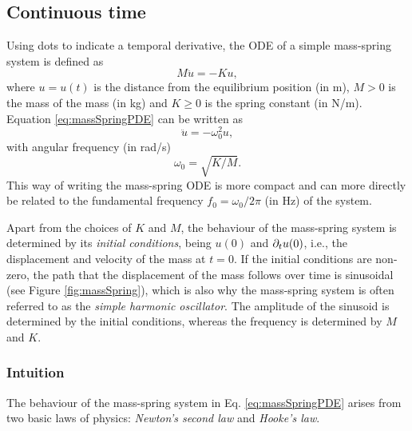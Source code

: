 \subsection{Continuous time}\label{sec:massSpringCont}
Using dots to indicate a temporal derivative, the ODE of a simple mass-spring system is defined as
\begin{equation}\label{eq:massSpringPDE}
    M\ddot u = -Ku,
\end{equation}
where $u = u(t)$ is the distance from the equilibrium position (in m), $M>0$ is the mass of the mass (in kg) and $K\geq 0$ is the spring constant (in N/m). Equation \eqref{eq:massSpringPDE} can be written as
\begin{equation}\label{eq:massSpringCompact}
    \ddot u = -\omega_0^2u,
\end{equation}
with angular frequency (in rad/s)
\begin{equation}\label{eq:omega0MassSpring}
    \omega_0 = \sqrt{K/M}.
\end{equation}
This way of writing the mass-spring ODE is more compact and can more directly be related to the fundamental frequency $f_0 = \omega_0 / 2 \pi$ (in Hz) of the system. 

Apart from the choices of $K$ and $M$, the behaviour of the mass-spring system is determined by its \textit{initial conditions}, being $u(0)$ and $\partial_t u(0)$, i.e., the displacement and velocity of the mass at $t = 0$. If the initial conditions are non-zero, the path that the displacement of the mass follows over time is sinusoidal (see Figure \ref{fig:massSpring}), which is also why the mass-spring system is often referred to as the \textit{simple harmonic oscillator}. The amplitude of the sinusoid is determined by the initial conditions, whereas the frequency is determined by $M$ and $K$. 



\subsubsection{Intuition}
The behaviour of the mass-spring system in Eq. \eqref{eq:massSpringPDE} arises from two basic laws of physics: \textit{Newton's second law} and \textit{Hooke's law}. 

